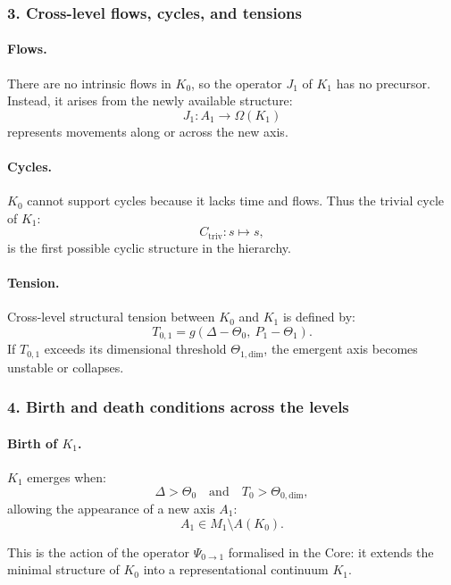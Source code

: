 \subsubsection{3. Cross-level flows, cycles, and tensions}

\paragraph{Flows.}
There are no intrinsic flows in $K_0$, so the operator $J_1$ of $K_1$ has
no precursor. Instead, it arises from the newly available structure:
\[
J_1 : A_1 \rightarrow \Omega(K_1)
\]
represents movements along or across the new axis.

\paragraph{Cycles.}
$K_0$ cannot support cycles because it lacks time and flows.
Thus the trivial cycle of $K_1$:
\[
C_{\mathrm{triv}} : s \mapsto s,
\]
is the first possible cyclic structure in the hierarchy.

\paragraph{Tension.}
Cross-level structural tension between $K_0$ and $K_1$ is defined by:
\[
T_{0,1} = g(\Delta - \Theta_0,\ P_1 - \Theta_1).
\]
If $T_{0,1}$ exceeds its dimensional threshold $\Theta_{1,\mathrm{dim}}$,
the emergent axis becomes unstable or collapses.

\subsubsection{4. Birth and death conditions across the levels}

\paragraph{Birth of \texorpdfstring{$K_1$}{K_1}.}
$K_1$ emerges when:
\[
\Delta > \Theta_0
\quad \text{and} \quad
T_0 > \Theta_{0,\mathrm{dim}},
\]
allowing the appearance of a new axis $A_1$:
\[
A_1 \in M_1 \setminus A(K_0).
\]

This is the action of the operator $\Psi_{0\rightarrow 1}$ formalised in the
Core: it extends the minimal structure of $K_0$ into a representational
continuum $K_1$.

